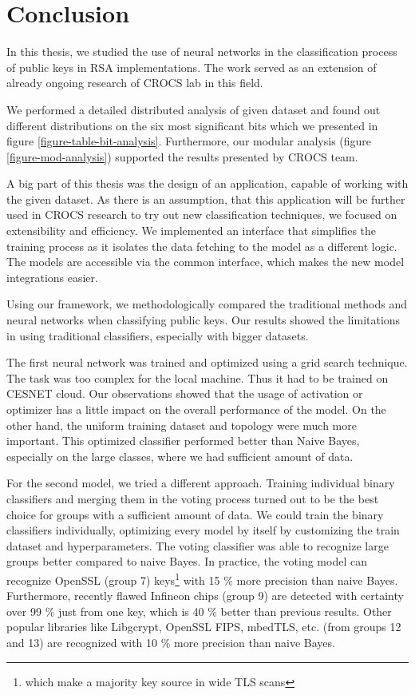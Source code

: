 \chapter{Conclusion}

In this thesis, we studied the use of neural networks in the classification process of public keys in RSA implementations. The work served as an extension of already ongoing research of CROCS lab in this field. 

We performed a detailed distributed analysis of given dataset and found out different distributions on the six most significant bits which we presented in figure \ref{figure-table-bit-analysis}. Furthermore, our modular analysis (figure \ref{figure-mod-analysis}) supported the results presented by CROCS team.

A big part of this thesis was the design of an application, capable of working with the given dataset. As there is an assumption, that this application will be further used in CROCS research to try out new classification techniques, we focused on extensibility and efficiency. We implemented an interface that simplifies the training process as it isolates the data fetching to the model as a different logic. The models are accessible via the common interface, which makes the new model integrations easier.

Using our framework, we methodologically compared the traditional methods and neural networks when classifying public keys. Our results showed the limitations in using traditional classifiers, especially with bigger datasets.

The first neural network was trained and optimized using a grid search technique. The task was too complex for the local machine. Thus it had to be trained on CESNET cloud. Our observations showed that the usage of activation or optimizer has a little impact on the overall performance of the model. On the other hand, the uniform training dataset and topology were much more important. This optimized classifier performed better than Naive Bayes, especially on the large classes, where we had sufficient amount of data.

For the second model, we tried a different approach. Training individual binary classifiers and merging them in the voting process
turned out to be the best choice for groups with a sufficient amount of data. We could train the binary classifiers individually, optimizing every model by itself by customizing the train dataset and hyperparameters. The voting classifier was able to recognize large groups better compared to naive Bayes. In practice, the voting model can recognize OpenSSL (group 7) keys\footnote{which make a majority key source in wide TLS scans} with 15 \% more precision than naive Bayes. Furthermore, recently flawed Infineon chips (group 9) are detected with certainty over 99 \% just from one key, which is 40 \% better than previous results. Other popular libraries like Libgcrypt, OpenSSL FIPS, mbedTLS, etc. (from groups 12 and 13) are recognized with 10 \% more precision than naive Bayes. 


